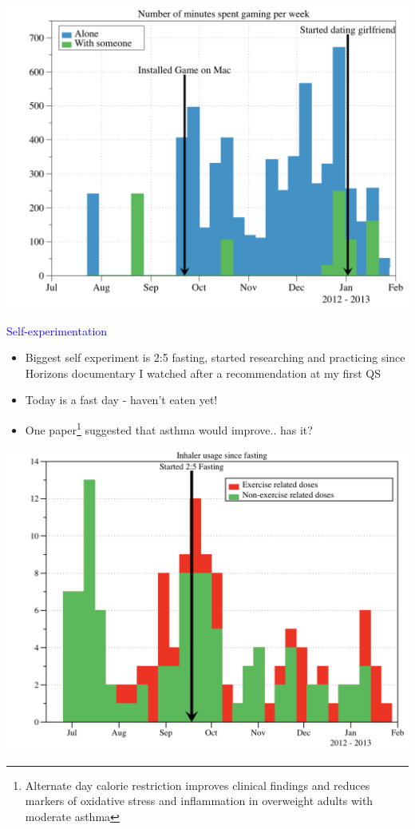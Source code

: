\documentclass[landscape]{slides}
\begin{document}
\begin{slide}
    \includegraphics[width=\textwidth]{lifelog-amount-gaming-per-week}
\end{slide}


\begin{slide}
    \textcolor{blue}{\Large{Self-experimentation}}

    \begin{itemize}
        \item Biggest self experiment is 2:5 fasting, started researching and practicing since Horizons documentary I watched after a recommendation at my first QS
        \item Today is a fast day - haven't eaten yet!
        \item One paper\footnote{Alternate day calorie restriction improves clinical findings and reduces markers of oxidative stress and inflammation in overweight adults
with moderate asthma} suggested that asthma would improve.. has it?
    \end{itemize}

\end{slide}

\begin{slide}
    \includegraphics[width=\textwidth]{lifelog-inhaler-analysis}
\end{slide}
\end{document}
